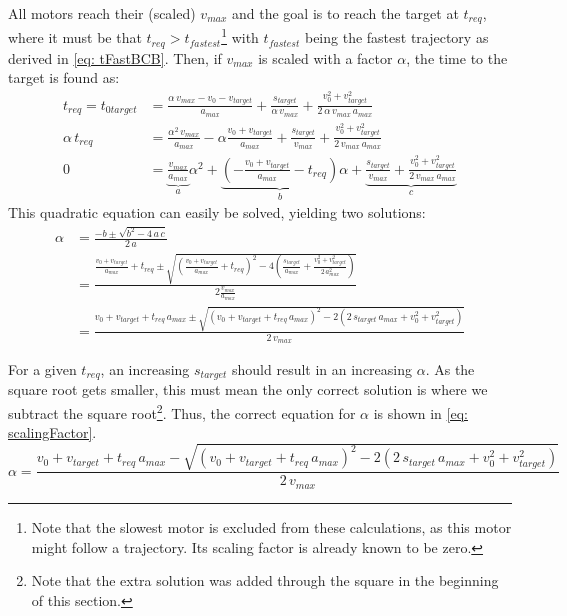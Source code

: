 \bigskip
\noindent All motors reach their (scaled) $v_{max}$ and the goal is to reach the target at $t_{req}$, where it must be that $t_{req} > t_{fastest}$\footnote{Note that the slowest motor is excluded from these calculations, as this motor might follow a trajectory. Its scaling factor is already known to be zero.} with $t_{fastest}$ being the fastest trajectory as derived in \cref{eq: tFastBCB}. Then, if $v_{max}$ is scaled with a factor $\alpha$, the time to the target is found as:
\begin{align*}
    t_{req} = t_{0target} &= \frac{\alpha \, v_{max} - v_0 - v_{target}}{a_{max}}+ \frac{s_{target}}{\alpha \, v_{max}} + \frac{v_0^2 + v_{target}^2}{2\, \alpha \, v_{max} \, a_{max}} \\
    \alpha \, t_{req} &= \frac{\alpha^2 \, v_{max}}{a_{max}} - \alpha \frac{v_0 + v_{target}}{a_{max}}+ \frac{s_{target}}{v_{max}} + \frac{v_0^2 + v_{target}^2}{2\, v_{max} \, a_{max}} \\
    0 &= \underbrace{\frac{v_{max}}{a_{max}}}_{a} \alpha^2 + \underbrace{\left(-\frac{v_0 + v_{target}}{a_{max}} - t_{req}\right)}_{b}\alpha + \underbrace{\frac{s_{target}}{v_{max}} + \frac{v_0^2 + v_{target}^2}{2\, v_{max} \, a_{max}}}_{c}
\end{align*}
\noindent This quadratic equation can easily be solved, yielding two solutions:
\begin{align*}
    \alpha &= \frac{-b \pm \sqrt{b^2 - 4 \,a\,c}}{2\,a} \\
    &= \frac{\frac{v_0 + v_{target}}{a_{max}} + t_{req} \pm \sqrt{\left(\frac{v_0 + v_{target}}{a_{max}} + t_{req}\right)^2 - 4 \left(\frac{s_{target}}{a_{max}} + \frac{v_0^2 + v_{target}^2}{2\,a_{max}^2}\right)}}{2 \frac{v_{max}}{a_{max}}} \\
    &= \frac{v_0 + v_{target}  + t_{req} \, a_{max} \pm \sqrt{\left({v_0 + v_{target}} + t_{req} \, a_{max} \right)^2 - 2 \left(2 \, s_{target} \, a_{max} + v_0^2 + v_{target}^2\right)}}{2 \, v_{max}} 
\end{align*}

\noindent For a given $t_{req}$, an increasing $s_{target}$ should result in an increasing $\alpha$. As the square root gets smaller, this must mean the only correct solution is where we subtract the square root\footnote{Note that the extra solution was added through the square in the beginning of this section.}. Thus, the correct equation for $\alpha$ is shown in \cref{eq: scalingFactor}.
\begin{equation}
    \alpha = \frac{v_0 + v_{target}  + t_{req} \, a_{max} - \sqrt{\left({v_0 + v_{target}} + t_{req} \, a_{max} \right)^2 - 2 \left(2 \, s_{target} \, a_{max} + v_0^2 + v_{target}^2\right)}}{2 \, v_{max}} \label{eq: scalingFactor}
\end{equation}



